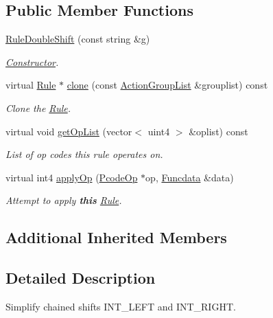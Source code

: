 \subsection*{Public Member Functions}
\begin{DoxyCompactItemize}
\item 
\mbox{\hyperlink{class_rule_double_shift_acddca5015440583d4ac1131512ec44ea}{Rule\+Double\+Shift}} (const string \&g)
\begin{DoxyCompactList}\small\item\em \mbox{\hyperlink{class_constructor}{Constructor}}. \end{DoxyCompactList}\item 
virtual \mbox{\hyperlink{class_rule}{Rule}} $\ast$ \mbox{\hyperlink{class_rule_double_shift_a0ce602237ed14729b9365571e0b7e47f}{clone}} (const \mbox{\hyperlink{class_action_group_list}{Action\+Group\+List}} \&grouplist) const
\begin{DoxyCompactList}\small\item\em Clone the \mbox{\hyperlink{class_rule}{Rule}}. \end{DoxyCompactList}\item 
virtual void \mbox{\hyperlink{class_rule_double_shift_a8fcab09748545ba2622103fbca5c0d04}{get\+Op\+List}} (vector$<$ uint4 $>$ \&oplist) const
\begin{DoxyCompactList}\small\item\em List of op codes this rule operates on. \end{DoxyCompactList}\item 
virtual int4 \mbox{\hyperlink{class_rule_double_shift_a02b2443037178261d417afd9689de91b}{apply\+Op}} (\mbox{\hyperlink{class_pcode_op}{Pcode\+Op}} $\ast$op, \mbox{\hyperlink{class_funcdata}{Funcdata}} \&data)
\begin{DoxyCompactList}\small\item\em Attempt to apply {\bfseries{this}} \mbox{\hyperlink{class_rule}{Rule}}. \end{DoxyCompactList}\end{DoxyCompactItemize}
\subsection*{Additional Inherited Members}


\subsection{Detailed Description}
Simplify chained shifts I\+N\+T\+\_\+\+L\+E\+FT and I\+N\+T\+\_\+\+R\+I\+G\+HT. 

